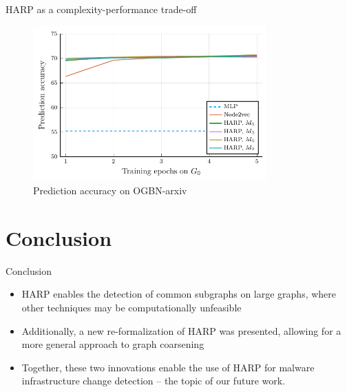 \documentclass[10pt]{beamer}
\begin{document}
\begin{frame}{HARP as a complexity-performance trade-off}
	\begin{figure}
		\centering
		\includegraphics[width=0.8\textwidth]{images/steps_accur/steps_accur.pdf}
		\caption{Prediction accuracy on OGBN-arxiv}
	\end{figure}
\end{frame}

\section{Conclusion}

\begin{frame}{Conclusion}
	\centering
	\begin{itemize}
		\item HARP enables the detection of common subgraphs on large graphs, where other techniques may be computationally unfeasible
		\item Additionally, a new re-formalization of HARP was presented, allowing for a more general approach to graph coarsening
		\item Together, these two innovations enable the use of HARP for malware infrastructure change detection -- the topic of our future work.
	\end{itemize}
\end{frame}
\end{document}
